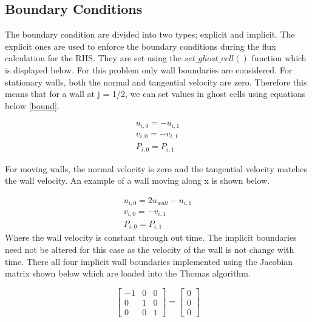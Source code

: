 \documentclass[paper=a4, fontsize=11pt, abstract=on]{scrartcl}
\numberwithin{equation}{section}		%
\numberwithin{figure}{section}			%
\numberwithin{table}{section}				%
\begin{document}
\subsection{Boundary Conditions}
The boundary condition are divided into two types; explicit and implicit. The explicit ones are used to enforce the boundary conditions during the flux calculation for the RHS. They are set using the $set\_ghost\_cell()$ function which is displayed below. For this problem only wall boundaries are considered. For stationary walls, both the normal and tangential velocity are zero. Therefore  this means that for a wall at j = 1/2, we can set values in ghost cells using equations below \ref{bound}.

\begin{equation}
  \begin{aligned}
 u_{i,0} = -u_{i,1}
  \\ v_{i,0} = -v_{i,1}\\
  P_{i,0} = P_{i,1}
 \end{aligned}
\end{equation}

For moving walls, the normal velocity is zero and the tangential velocity matches
the wall velocity. An example of a wall moving along x is shown below.

\begin{equation}
  \begin{aligned}
 u_{i,0} = 2u_{wall}-u_{i,1}
  \\ v_{i,0} = -v_{i,1}\\
  P_{i,0} = P_{i,1}
 \end{aligned}
\end{equation}
Where the wall velocity is constant through out time. The implicit boundaries need not be altered for this case as the velocity of the wall is not change with time. There all four implicit wall boundaries implemented using the Jacobian matrix shown below which are loaded into the Thomas algorithm.

\begin{equation}
\label{nav2}
\begin{bmatrix}
   -1 & 0& 0 \\
   0 &1 &0 \\
    0 &0& 1
\end{bmatrix} = \begin{bmatrix}
   0 \\
   0 \\
    0
\end{bmatrix}
\end{equation} 
\end{document}
